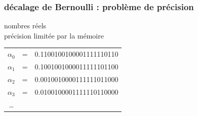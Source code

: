 \documentclass{beamer}
\begin{document}
\begin{frame}
  \frametitle{décalage de Bernoulli : problème de 
    précision}
  \begin{minipage}{0.49\textwidth}
    \begin{center}
      nombres réels \\
      précision limitée par la mémoire
    \end{center}
    \medskip
    \begin{tabular}{c c l}
      $\alpha_0$ & = & 0.1100100100001111110110 \\
      $\alpha_1$ & = & 0.100100100001111110110\textcolor{rouge}{0} \\
      $\alpha_2$ & = & 0.00100100001111110110\textcolor{rouge}{00} \\
      $\alpha_3$ & = & 0.0100100001111110110\textcolor{rouge}{000} \\
      \ldots \\
    \end{tabular} 
    \medskip
  \end{minipage}
\end{frame}
\end{document}
